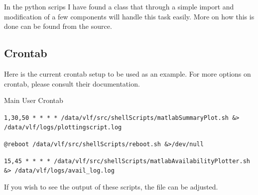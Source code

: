 \documentclass{article}
\begin{document}
In the python scrips I have found a class that through a simple import and modification of a few components will handle this task easily. More on how this is done can be found from the source.



\subsection{Crontab}
Here is the current crontab setup to be used as an example. For more options on crontab, please consult their documentation.

Main User Crontab

\texttt{1,30,50 * * * * /data/vlf/src/shellScripts/matlabSummaryPlot.sh \&> /data/vlf/logs/plottingscript.log}

\texttt{@reboot  /data/vlf/src/shellScripts/reboot.sh \&>/dev/null}

\texttt{15,45 * * * * /data/vlf/src/shellScripts/matlabAvailabilityPlotter.sh \&> /data/vlf/logs/avail\_log.log}


If you wish to see the output of these scripts, the file can be adjusted.
\end{document}
